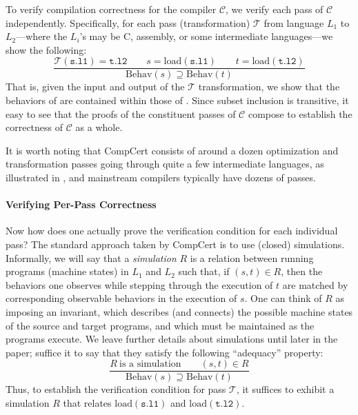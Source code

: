 To verify compilation correctness for the compiler $\mathcal{C}$, we verify each pass of
$\mathcal{C}$ independently.  Specifically, for each pass (transformation) $\mathcal{T}$ from
language $L_1$ to $L_2$---where the $L_i$'s may be C, assembly, or some intermediate languages---we
show the following:
\[
\frac{
\mathcal{T}(\mathtt{s.l1}) = \mathtt{t.l2} \qquad
s = \mathrm{load}(\mathtt{s.l1}) \qquad
t = \mathrm{load}(\mathtt{t.l2})
}
{
\mathrm{Behav}(s) \supseteq \mathrm{Behav}(t)
}
\]
That is, given the input  and output  of the $\mathcal{T}$ transformation, we
show that the behaviors of  are contained within those of .  Since subset
inclusion is transitive, it easy to see that the proofs of the constituent passes of $\mathcal{C}$
compose to establish the correctness of $\mathcal{C}$ as a whole.

It is worth noting that CompCert consists of around a dozen optimization and transformation passes
going through quite a few intermediate languages, as illustrated in
, and mainstream compilers typically have dozens of passes.


\paragraph{Verifying Per-Pass Correctness}

Now how does one actually prove the verification condition for each individual pass?  The standard
approach taken by CompCert is to use (closed) simulations.  Informally, we will say that a
\emph{simulation} $R$ is a relation between running programs (\ie machine states) in $L_1$ and $L_2$
such that, if $(s,t) \in R$, then the behaviors one observes while stepping through the execution of
$t$ are matched by corresponding observable behaviors in the execution of $s$.  One can think of $R$
as imposing an invariant, which describes (and connects) the possible machine states of the source
and target programs, and which must be maintained as the programs execute.  We leave further details
about simulations until later in the paper; suffice it to say that they satisfy the following
``adequacy'' property:
\[
\frac{
R~\mbox{is a simulation} \qquad
(s,t)\in R
}{
\mathrm{Behav}(s) \supseteq \mathrm{Behav}(t)
}
\]
Thus, to establish the verification condition for pass $\mathcal{T}$, it suffices to exhibit a
simulation $R$ that relates $\mathrm{load}(\mathtt{s.l1})$ and $\mathrm{load}(\mathtt{t.l2})$.


